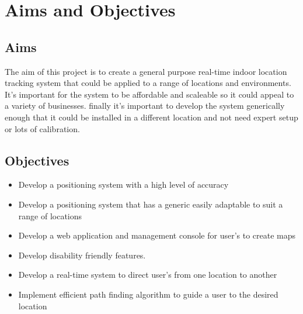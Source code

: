 \section{Aims and Objectives}\label{aimssandobj}
\subsection{Aims}
The aim of this project is to create a general purpose real-time indoor location tracking system that could be applied to a range of locations and environments. It's important for the system  to be affordable and scaleable so it could appeal to a variety of businesses. finally it's important to develop the system generically enough that it could be installed in a different location and not need expert setup or lots of calibration.

\subsection{Objectives}
\begin{itemize}
	\item Develop a positioning system with a high level of accuracy
	\item Develop a positioning system that has a generic easily adaptable to suit a range of locations
	\item Develop a web application and management console for user’s to create maps
	\item Develop disability friendly features.
	\item Develop a real-time system to direct user's from one location to another
	\item Implement efficient path finding algorithm to guide a user to the desired location
\end{itemize}
\newpage